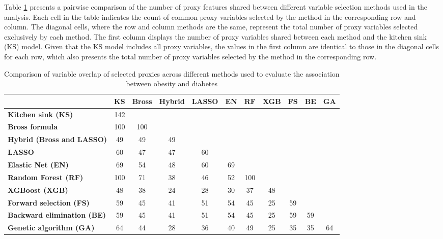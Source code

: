\documentclass[sn-vancouver,Numbered,lineno,pdflatex]{sn-jnl}
\begin{document}
Table \ref{tab:method-comparison-updated} presents a pairwise comparison
of the number of proxy features shared between different variable
selection methods used in the analysis. Each cell in the table indicates
the count of common proxy variables selected by the method in the
corresponding row and column. The diagonal cells, where the row and
column methods are the same, represent the total number of proxy
variables selected exclusively by each method. The first column displays
the number of proxy variables shared between each method and the kitchen
sink (KS) model. Given that the KS model includes all proxy variables,
the values in the first column are identical to those in the diagonal
cells for each row, which also presents the total number of proxy
variables selected by the method in the corresponding row.

\begin{table}[htbp]
\centering
\caption{Comparison of variable overlap of selected proxies across different methods used to evaluate the association between obesity and diabetes}
\label{tab:method-comparison-updated}
\begin{tabular}{lcccccccccc}
\toprule
 & \textbf{KS} & \textbf{Bross} & \textbf{Hybrid} & \textbf{LASSO} & \textbf{EN} & \textbf{RF} & \textbf{XGB} & \textbf{FS} & \textbf{BE} & \textbf{GA} \\
\midrule
\textbf{Kitchen sink (KS)} & 142 & & & & & & & & & \\
\textbf{Bross formula} & 100 & 100 & & & & & & & & \\
\textbf{Hybrid (Bross and LASSO)} & 49 & 49 & 49 & & & & & & & \\
\textbf{LASSO} & 60 & 47 & 47 & 60 & & & & & & \\
\textbf{Elastic Net (EN)} & 69 & 54 & 48 & 60 & 69 & & & & & \\
\textbf{Random Forest (RF)} & 100 & 71 & 38 & 46 & 52 & 100 & & & & \\  
\textbf{XGBoost (XGB)} & 48 & 38 & 24 & 28 & 30 & 37 & 48 & & & \\
\textbf{Forward selection (FS)} & 59 & 45 & 41 & 51 & 54 & 45 & 25 & 59 & & \\
\textbf{Backward elimination (BE)} & 59 & 45 & 41 & 51 & 54 & 45 & 25 & 59 & 59 & \\
\textbf{Genetic algorithm (GA)} & 64 & 44 & 28 & 36 & 40 & 49 & 25 & 35 & 35 & 64 \\
\bottomrule
\end{tabular}
\end{table}
\end{document}
